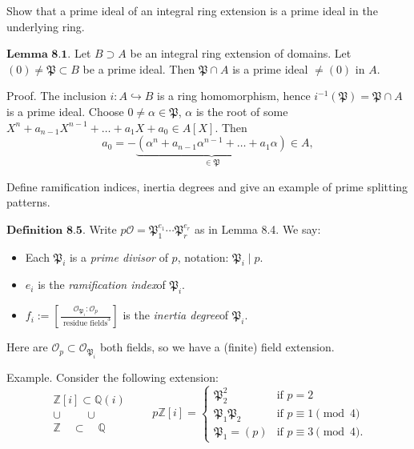 Show that a prime ideal of an integral ring extension is a prime ideal in the underlying ring.

\( \textbf{Lemma 8.1.} \) 
Let \( B \supset A \) be an integral ring extension of domains. Let \( (0) \neq \mathfrak{P} \subset B \) be a prime ideal. 
Then \(\mathfrak{P} \cap A \) is a prime ideal \(\neq (0) \) in \( A \).

Proof. 
The inclusion \( i : A \hookrightarrow B \) is a ring homomorphism, hence \( i^{-1}(\mathfrak{P}) = \mathfrak{P} \cap A \) is a prime ideal. 
Choose \( 0 \neq \alpha \in \mathfrak{P} \), \(\alpha\) is the root of some \( X^n + a_{n-1}X^{n-1} + \ldots + a_1X + a_0 \in A[X] \). Then
\[
a_0 = -\underbrace{(\alpha^n + a_{n-1}\alpha^{n-1} + \ldots + a_1\alpha)}_{\in \mathfrak{P}} \in A,
\]


Define ramification indices, inertia degrees and give an example of prime splitting patterns.

\( \textbf{Definition 8.5.} \) Write \( p\mathcal{O} = \mathfrak{P}_1^{e_1} \cdots \mathfrak{P}_r^{e_r} \) as in Lemma 8.4. We say:
\begin{itemize}
    \item Each \(\mathfrak{P}_i\) is a \textit{prime divisor} of \( p \), notation: \(\mathfrak{P}_i \mid p\).
    \item \( e_i \) is the \textit{ramification index}\footnotemark[2] of \(\mathfrak{P}_i\).
    \item \( f_i := \left[ \frac{\mathcal{O}_{\mathfrak{P}_i} : \mathcal{O}_{p}}{\text{ residue fields}^3} \right] \) is the \textit{inertia degree}\footnotemark[4] of \(\mathfrak{P}_i\).
\end{itemize}

Here are \(\mathcal{O}_p \subset \mathcal{O}_{\mathfrak{P}_i}\) both fields, so we have a (finite) field extension.

Example. Consider the following extension:
\[
\begin{array}{c}
    \mathbb{Z}[i] \subset \mathbb{Q}(i) \\
    \cup \quad \quad \, \cup \\
    \mathbb{Z} \quad \subset \quad \mathbb{Q}
\end{array}
\quad \quad
p\mathbb{Z}[i] = 
\begin{cases}
    \mathfrak{P}_2^2 & \text{if } p = 2 \\
    \mathfrak{P}_1 \mathfrak{P}_2 & \text{if } p \equiv 1 \pmod{4} \\
    \mathfrak{P}_1 = (p) & \text{if } p \equiv 3 \pmod{4}.
\end{cases}
\]

